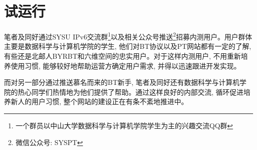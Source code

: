 \section{试运行}
\label{sec:preop}

笔者及同好通过SYSU IPv6交流群\footnote{一个群员以中山大学数据科学与计算机学院学生为主的兴趣交流QQ群}以及相关公众号推送\footnote{微信公众号: SYSPT}招募内测用户。用户群体主要是数据科学与计算机学院的学生, 他们对BT协议以及PT网站都有一定的了解, 有些还是北邮人BYRBT和六维空间的忠实用户。对于这样内测用户, 不用重新培养使用习惯, 能够较好地帮助运营方确定用户需求, 并得以迅速跟进开发实现。

而对另一部分通过推送慕名而来的BT新手, 笔者及同好还有数据科学与计算机学院的热心同学们热情地为他们提供了帮助。通过这样良好的内部交流, 循环促进培养新人的用户习惯, 整个网站的建设正在有条不紊地推进中。
